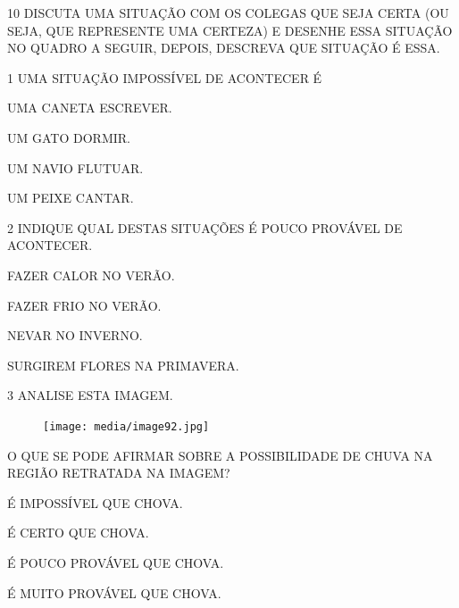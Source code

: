 \num{10} DISCUTA UMA SITUAÇÃO COM OS COLEGAS QUE SEJA CERTA (OU SEJA, QUE REPRESENTE UMA CERTEZA) E DESENHE ESSA SITUAÇÃO NO QUADRO A SEGUIR, DEPOIS, DESCREVA QUE SITUAÇÃO É ESSA.

\begin{mdframed}[linewidth=2pt,linecolor=salmao,roundcorner=10pt]
\vspace{18cm}
\end{mdframed}


\num{1} UMA SITUAÇÃO IMPOSSÍVEL DE ACONTECER É

\begin{escolha}
\item UMA CANETA ESCREVER.

\item UM GATO DORMIR.

\item UM NAVIO FLUTUAR.

\item UM PEIXE CANTAR.
\end{escolha}

\num{2} INDIQUE QUAL DESTAS SITUAÇÕES É POUCO PROVÁVEL DE ACONTECER.

\begin{escolha}
\item FAZER CALOR NO VERÃO.

\item FAZER FRIO NO VERÃO.

\item NEVAR NO INVERNO.

\item SURGIREM FLORES NA PRIMAVERA.
\end{escolha}

\pagebreak
\num{3} ANALISE ESTA IMAGEM.

\begin{figure}[htpb!]
\centering
\texttt{[image: media/image92.jpg]}
\end{figure}

O QUE SE PODE AFIRMAR SOBRE A POSSIBILIDADE DE CHUVA NA REGIÃO RETRATADA NA IMAGEM?

\begin{escolha}
\item É IMPOSSÍVEL QUE CHOVA.

\item É CERTO QUE CHOVA.

\item É POUCO PROVÁVEL QUE CHOVA.

\item É MUITO PROVÁVEL QUE CHOVA.
\end{escolha}

